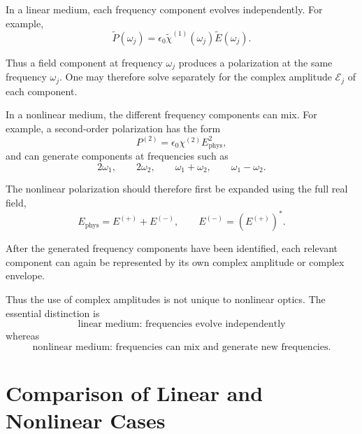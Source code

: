 \documentclass[11pt]{article}
\begin{document}
In a linear medium, each frequency component evolves independently.  For example,
\begin{equation}
\tilde{P}(\omega_j)
=
\epsilon_0
\tilde{\chi}^{(1)}(\omega_j)
\tilde{E}(\omega_j).
\end{equation}

Thus a field component at frequency \(\omega_j\) produces a polarization at the same frequency \(\omega_j\).  One may therefore solve separately for the complex amplitude \(\mathcal{E}_j\) of each component.

In a nonlinear medium, the different frequency components can mix.  For example, a second-order polarization has the form
\begin{equation}
P^{(2)}
=
\epsilon_0\chi^{(2)}
E_{\mathrm{phys}}^2,
\end{equation}
and can generate components at frequencies such as
\begin{equation}
2\omega_1,\qquad
2\omega_2,\qquad
\omega_1+\omega_2,\qquad
\omega_1-\omega_2.
\end{equation}

The nonlinear polarization should therefore first be expanded using the full real field,
\begin{equation}
E_{\mathrm{phys}}
=
E^{(+)}+E^{(-)},
\qquad
E^{(-)}
=
\left(E^{(+)}\right)^*.
\end{equation}

After the generated frequency components have been identified, each relevant component can again be represented by its own complex amplitude or complex envelope.

Thus the use of complex amplitudes is not unique to nonlinear optics.  The essential distinction is
\begin{equation}
\boxed{
\text{linear medium: frequencies evolve independently}
}
\end{equation}
whereas
\begin{equation}
\boxed{
\text{nonlinear medium: frequencies can mix and generate new frequencies}.
}
\end{equation}

\section{Comparison of Linear and Nonlinear Cases}
\end{document}
